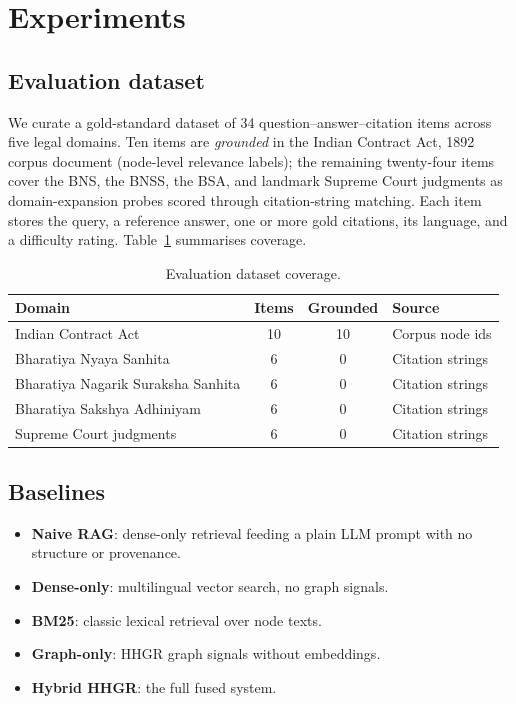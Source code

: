 \section{Experiments}

\subsection{Evaluation dataset}

We curate a gold-standard dataset of 34 question--answer--citation items across
five legal domains. Ten items are \emph{grounded} in the Indian Contract Act,
1892 corpus document (node-level relevance labels); the remaining twenty-four
items cover the BNS, the BNSS, the BSA, and landmark Supreme Court judgments as
domain-expansion probes scored through citation-string matching. Each item
stores the query, a reference answer, one or more gold citations, its language,
and a difficulty rating. Table~\ref{tab:dataset} summarises coverage.

\begin{table}[htbp]
\centering
\begin{tabular}{lccl}
\hline
\textbf{Domain} & \textbf{Items} & \textbf{Grounded} & \textbf{Source}\\
\hline
Indian Contract Act & 10 & 10 & Corpus node ids\\
Bharatiya Nyaya Sanhita & 6 & 0 & Citation strings\\
Bharatiya Nagarik Suraksha Sanhita & 6 & 0 & Citation strings\\
Bharatiya Sakshya Adhiniyam & 6 & 0 & Citation strings\\
Supreme Court judgments & 6 & 0 & Citation strings\\
\hline
\end{tabular}
\caption{Evaluation dataset coverage.}
\label{tab:dataset}
\end{table}

\subsection{Baselines}

\begin{itemize}
  \item \textbf{Naive RAG}: dense-only retrieval feeding a plain LLM prompt
        with no structure or provenance.
  \item \textbf{Dense-only}: multilingual vector search, no graph signals.
  \item \textbf{BM25}: classic lexical retrieval over node texts.
  \item \textbf{Graph-only}: HHGR graph signals without embeddings.
  \item \textbf{Hybrid HHGR}: the full fused system.
\end{itemize}

